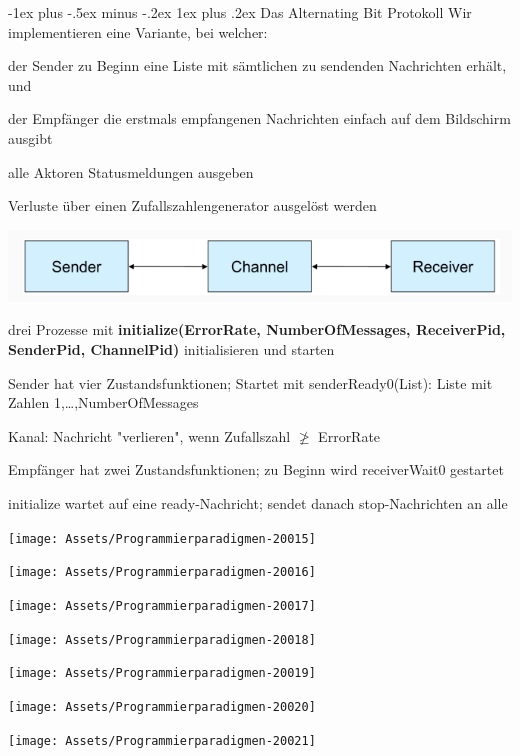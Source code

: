 \documentclass[10pt]{article}
\makeatletter
\renewcommand{\subsubsection}{\@startsection{subsubsection}{3}{0mm}%
                                {-1ex plus -.5ex minus -.2ex}%
                                {1ex plus .2ex}%
                                {\normalfont\small\bfseries}}
\makeatother
\begin{document}
  \subsubsection{Das Alternating Bit Protokoll}
  Wir implementieren eine Variante, bei welcher: 
  \begin{itemize*}
    \item der Sender zu Beginn eine Liste mit sämtlichen zu sendenden Nachrichten erhält, und
    \item der Empfänger die erstmals empfangenen Nachrichten einfach auf dem Bildschirm ausgibt
    \item alle Aktoren Statusmeldungen ausgeben
    \item Verluste über einen Zufallszahlengenerator ausgelöst werden
  \end{itemize*}
  \begin{center}
    \centering
    \includegraphics[width=0.7\linewidth]{Assets/Programmierparadigmen-alternate-bit-protokoll.png}
  \end{center}
  drei Prozesse mit \textbf{initialize(ErrorRate, NumberOfMessages, ReceiverPid, SenderPid, ChannelPid)} initialisieren und starten
  \begin{itemize*}
    \item Sender hat vier Zustandsfunktionen; Startet mit senderReady0(List): Liste mit Zahlen 1,…,NumberOfMessages
    \item Kanal: Nachricht "verlieren", wenn Zufallszahl $\ngeq$ ErrorRate
    \item Empfänger hat zwei Zustandsfunktionen; zu Beginn wird receiverWait0 gestartet
    \item initialize wartet auf eine ready-Nachricht; sendet danach stop-Nachrichten an alle
  \end{itemize*}
  \begin{center}
    \centering
    \texttt{[image: Assets/Programmierparadigmen-20015]}
  \end{center}
  \begin{center}
    \centering
    \texttt{[image: Assets/Programmierparadigmen-20016]}
  \end{center}
  \begin{center}
    \centering
    \texttt{[image: Assets/Programmierparadigmen-20017]}
  \end{center}
  \begin{center}
    \centering
    \texttt{[image: Assets/Programmierparadigmen-20018]}
  \end{center}
  \begin{center}
    \centering
    \texttt{[image: Assets/Programmierparadigmen-20019]}
  \end{center}
  \begin{center}
    \centering
    \texttt{[image: Assets/Programmierparadigmen-20020]}
  \end{center}
  \begin{center}
    \centering
    \texttt{[image: Assets/Programmierparadigmen-20021]}
  \end{center}
  
\end{document}
